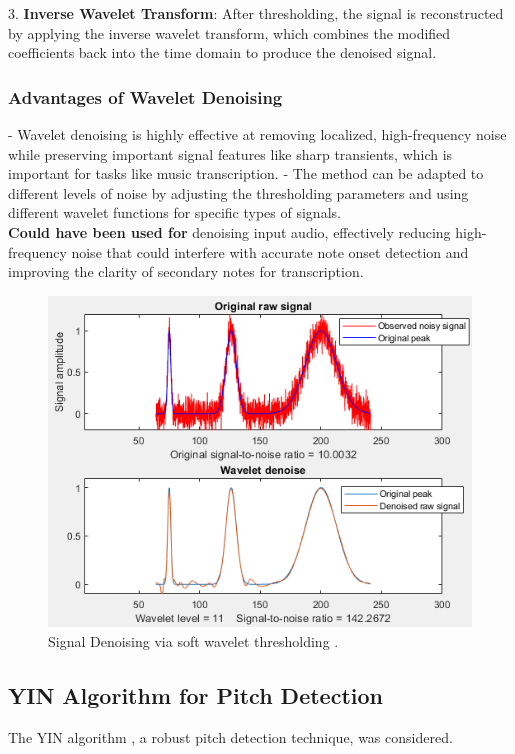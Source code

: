 \documentclass{article}
\begin{document}
3. \textbf{Inverse Wavelet Transform}: After thresholding, the signal is reconstructed by applying the inverse wavelet transform, which combines the modified coefficients back into the time domain to produce the denoised signal.

\subsubsection{Advantages of Wavelet Denoising}
- Wavelet denoising is highly effective at removing localized, high-frequency noise while preserving important signal features like sharp transients, which is important for tasks like music transcription.
- The method can be adapted to different levels of noise by adjusting the thresholding parameters and using different wavelet functions for specific types of signals. \\

\textbf{Could have been used for} denoising input audio, effectively reducing high-frequency noise that could interfere with accurate note onset detection and improving the clarity of secondary notes for transcription.

\begin{figure}[H]
\includegraphics[width=\textwidth,scale=0.5]{images/denoise-filter.png}
\caption{ Signal Denoising via soft wavelet thresholding \cite{Wavelets}.}
\end{figure}

\newpage



\subsection{YIN Algorithm for Pitch Detection}
The YIN algorithm \cite{YIN-2002}, a robust pitch detection technique, was considered.
\end{document}

